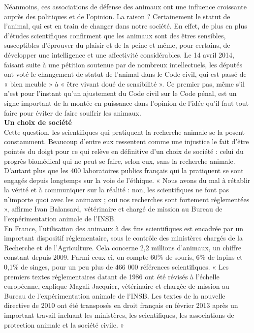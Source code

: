 \documentclass[8pt]{article}
\begin{document}
Néanmoins, ces associations de défense des animaux ont une influence croissante auprès des politiques et de l’opinion. La raison ? Certainement le statut de l’animal, qui est en train de changer dans notre société. En effet, de plus en plus d’études scientifiques confirment que les animaux sont des êtres sensibles, susceptibles d’éprouver du plaisir et de la peine et même, pour certains, de développer une intelligence et une affectivité considérables. Le 14 avril 2014, faisant suite à une pétition soutenue par de nombreux intellectuels, les députés ont voté le changement de statut de l’animal dans le Code civil, qui est passé de « bien meuble » à « être vivant doué de sensibilité ». Ce premier pas, même s’il n’est pour l’instant qu’un ajustement du Code civil sur le Code pénal, est un signe important de la montée en puissance dans l’opinion de l’idée qu’il faut tout faire pour éviter de faire souffrir les animaux. \\

\textbf{Un choix de société}\\

Cette question, les scientifiques qui pratiquent la recherche animale se la posent constamment. Beaucoup d’entre eux ressentent comme une injustice le fait d’être pointés du doigt pour ce qui relève en définitive d’un choix de société : celui du progrès biomédical qui ne peut se faire, selon eux, sans la recherche animale. D’autant plus que les 400 laboratoires publics français qui la pratiquent se sont engagés depuis longtemps sur la voie de l’éthique. « Nous avons du mal à rétablir la vérité et à communiquer sur la réalité : non, les scientifiques ne font pas n’importe quoi avec les animaux ; oui nos recherches sont fortement réglementées », affirme Ivan Balansard, vétérinaire et chargé de mission au Bureau de l’expérimentation animale de l’INSB.\\


En France, l’utilisation des animaux à des fins scientifiques est encadrée par un important dispositif réglementaire, sous le contrôle des ministères chargés de la Recherche et de l’Agriculture. Cela concerne 2,2 millions d’animaux, un chiffre constant depuis 2009. Parmi ceux-ci, on compte 60\% de souris, 6\% de lapins et 0,1\% de singes, pour un peu plus de 466 000 références scientifiques. « Les premiers textes réglementaires datant de 1986 ont été révisés à l’échelle européenne, explique Magali Jacquier, vétérinaire et chargée de mission au Bureau de l’expérimentation animale de l’INSB. Les textes de la nouvelle directive de 2010 ont été transposés en droit français en février 2013 après un important travail incluant les ministères, les scientifiques, les associations de protection animale et la société civile. »\\
\end{document}

